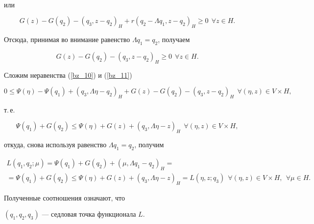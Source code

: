 \begin{pf}
\begin{multline}
\end{multline}


или


$$


G(z)-G(q_2)-(q_3, z-q_2)_H+


r ({q_2-\Lambda q_1, z-q_2})_H \geq 0 \ \ \forall z \in H.


$$


Отсюда, принимая во внимание равенство $\Lambda q_1=q_2$, получаем


\begin{equation}


G(z)-G(q_2)-(q_3, z-q_2)_H \geq 0 \ \ \forall z \in H.


\label{bz_11}


\end{equation}


Сложим неравенства (\ref{bz_10}) и (\ref{bz_11})


$$


0 \leq \Psi (\eta)-\Psi (q_1)+(q_3 , \Lambda \eta-q_2)_H+


G(z)-G(q_2)-(q_3, z-q_2)_H


\ \ \forall (\eta, z) \in V \times H,


$$


т.\,е.


$$


\Psi (q_1)+G(q_2) \leq \Psi (\eta)+G(z)+(q_3 , \Lambda \eta-z)_H


\ \ \forall (\eta, z) \in V \times H,


$$


откуда, снова используя равенство $\Lambda q_1=q_2$, получим


\begin{multline}


L(q_1, q_2; \mu)=\Psi (q_1)+G(q_2)+(\mu, \Lambda q_1-q_2)_H= \\


%


=\Psi (q_1)+G(q_2) \leq


\Psi (\eta)+G(z)+(q_3 , \Lambda \eta-z)_H= 


L(\eta , z; q_3)


\ \ \forall (\eta, z) \in V \times H, \ \ \forall \mu \in H.


\label{bz_12}


\end{multline}


Полученные соотношения означают, что


$(q_1, q_2, q_3)$ --- седловая точка функционала $L$.






\end{pf}
